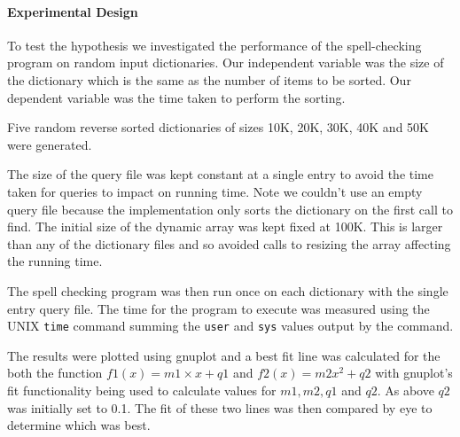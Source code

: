 \documentclass[a4]{article}
\begin{document}
\paragraph{Experimental Design}
To test the hypothesis we investigated the performance of the spell-checking program on random input dictionaries.  Our independent variable was the size of the dictionary which is the same as the number of items to be sorted.  Our dependent variable was the time taken to perform the sorting.

Five random reverse sorted dictionaries of sizes 10K, 20K, 30K, 40K and 50K were generated.

The size of the query file was kept constant at a single entry to avoid the time taken for queries to impact on running time.  Note we couldn't use an empty query file because the implementation only sorts the dictionary on the first call to find.  The initial size of the dynamic array was kept fixed at 100K.  This is larger than any of the dictionary files and so avoided calls to resizing the array affecting the running time.

The spell checking program was then run once on each dictionary with the single entry query file.  The time for the program to execute was measured using the UNIX \texttt{time} command summing the \texttt{user} and \texttt{sys} values output by the command.  

The results were plotted using gnuplot and a best fit line was calculated for the both the function $f1(x) = m1 \times x + q1$ and $f2(x) = m2x^2 + q2$ with gnuplot's fit functionality being used to calculate values for $m1, m2, q1$ and $q2$.  As above $q2$ was initially set to 0.1.  The fit of these two lines was then compared by eye to determine which was best. 
\end{document}

